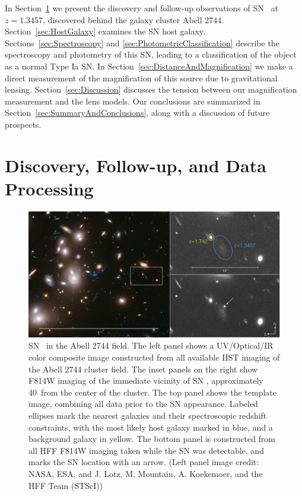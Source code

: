 In Section~\ref{sec:DiscoveryAndFollowup} we present the discovery and
follow-up observations of SN \tomas\ at $z=1.3457$, discovered behind
the galaxy cluster Abell 2744.  Section~\ref{sec:HostGalaxy} examines
the SN host galaxy.  Sections~\ref{sec:Spectroscopy}
and \ref{sec:PhotometricClassification} describe the spectroscopy and
photometry of this SN, leading to a classification of the object as a
normal Type Ia SN.  In Section~\ref{sec:DistanceAndMagnification} we
make a direct measurement of the magnification of this source due to
gravitational lensing.  Section~\ref{sec:Discussion} discusses the
tension between our magnification measurement and the lens models. Our
conclusions are summarized in Section~\ref{sec:SummaryAndConclusions},
along with a discussion of future prospects. 

\section{Discovery, Follow-up, and Data Processing}
\label{sec:DiscoveryAndFollowup}

\begin{figure}
\begin{center}
\includegraphics[width=\textwidth]{FIG/discovery_image_lowres}
\caption{  \label{fig:DiscoveryImage} 
SN \tomas\ in the Abell 2744 field.  The left panel shows a
UV/Optical/IR color composite image constructed from all available HST
imaging of the Abell 2744 cluster field.  The inset panels on the right
show F814W imaging of the immediate vicinity of SN \tomas,
approximately 40\arcsec\ from the center of the cluster. The top panel
shows the template image, combining all data prior to the SN
appearance.  Labeled ellipses mark the nearest galaxies and their
spectroscopic redshift constraints, with the most likely host
galaxy marked in blue, and a background galaxy in yellow. The bottom
panel is constructed from all HFF F814W imaging taken while the SN was
detectable, and marks the SN location with an arrow.  (Left panel
image credit: NASA, ESA, and J. Lotz, M. Mountain, A. Koekemoer, and
the HFF Team (STScI)) }
\end{center}
\end{figure}

